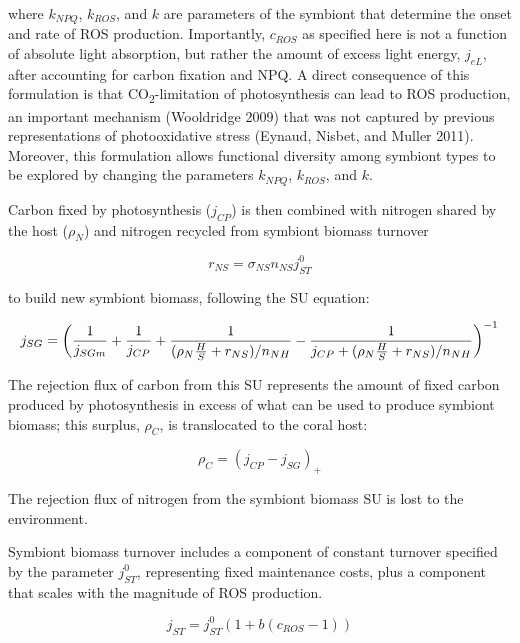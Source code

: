 \documentclass[]{elsarticle} %
\begin{document}
where \(k_{NPQ}\), \(k_{ROS}\), and \(k\) are parameters of the symbiont
that determine the onset and rate of ROS production. Importantly,
\(c_{ROS}\) as specified here is not a function of absolute light
absorption, but rather the amount of excess light energy, \(j_{eL}\),
after accounting for carbon fixation and NPQ. A direct consequence of
this formulation is that CO\textsubscript{2}-limitation of
photosynthesis can lead to ROS production, an important mechanism
(Wooldridge 2009) that was not captured by previous representations of
photooxidative stress (Eynaud, Nisbet, and Muller 2011). Moreover, this
formulation allows functional diversity among symbiont types to be
explored by changing the parameters \(k_{NPQ}\), \(k_{ROS}\), and \(k\).

Carbon fixed by photosynthesis (\(j_{CP}\)) is then combined with
nitrogen shared by the host (\(\rho_N\)) and nitrogen recycled from
symbiont biomass turnover

\begin{equation} r_{NS}=\sigma_{NS}n_{NS}j_{ST}^0 \end{equation}

to build new symbiont biomass, following the SU equation:

\begin{equation} j_{SG} = \bigg({1 \over j_{SGm}} + {1 \over j_{CP}} + {1 \over {(\rho_N{H \over S} + r_{NS}) / n_{NH}}} - {1 \over {j_{CP} + (\rho_N{H \over S} + r_{NS}) / n_{NH}}}\bigg)^{-1} \end{equation}

The rejection flux of carbon from this SU represents the amount of fixed
carbon produced by photosynthesis in excess of what can be used to
produce symbiont biomass; this surplus, \(\rho_C\), is translocated to
the coral host:

\begin{equation} \rho_C = (j_{CP} - j_{SG})_+ \end{equation}

The rejection flux of nitrogen from the symbiont biomass SU is lost to
the environment.

Symbiont biomass turnover includes a component of constant turnover
specified by the parameter \(j_{ST}^0\), representing fixed maintenance
costs, plus a component that scales with the magnitude of ROS
production.

\begin{equation} j_{ST} = j_{ST}^0(1 + b(c_{ROS}-1)) \end{equation}
\end{document}
